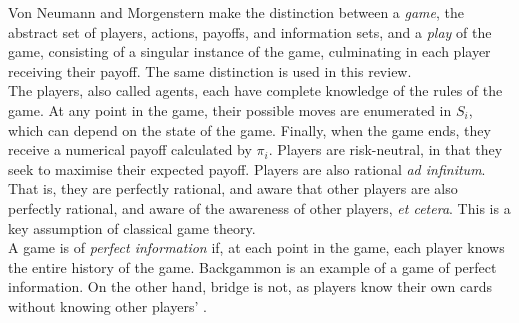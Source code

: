 

 Von Neumann and Morgenstern make the distinction between a \emph{game}, the abstract set of players, actions, payoffs, and information sets, and a \emph{play} of the game, consisting of a singular instance of the game, culminating in each player receiving their payoff. The same distinction is used in this review. \\



The players, also called agents, each have complete knowledge of the rules of the game. At any point in the game, their possible moves are enumerated in $S_i$, which can depend on the state of the game. Finally, when the game ends, they receive a numerical payoff calculated by $\pi_i$. Players are risk-neutral, in that they seek to maximise their expected payoff. Players are also rational \emph{ad infinitum}. That is, they are perfectly rational, and aware that other players are also perfectly rational, and aware of the awareness of other players, \emph{et cetera}. This is a key assumption of classical game theory. \\

A game is of \emph{perfect information} if, at each point in the game, each player knows the entire history of the game. Backgammon is an example of a game of perfect information. On the other hand, bridge is not, as players know their own cards without knowing other players' \cite{RN78}. \\


